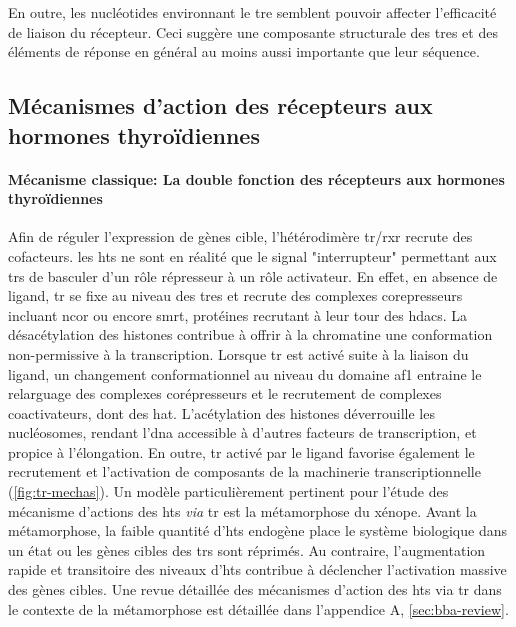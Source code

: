 

En outre, les nucléotides environnant le \gls{tre} semblent pouvoir affecter l'efficacité de liaison du récepteur.
Ceci suggère une composante structurale des \glspl{tre} et des éléments de réponse en général au moins aussi importante que leur séquence.



\subsection{Mécanismes d'action des récepteurs aux hormones thyroïdiennes}

\paragraph{Mécanisme classique: La double fonction des récepteurs aux hormones thyroïdiennes}
Afin de réguler l'expression de gènes cible, l'hétérodimère \gls{tr}/\gls{rxr} recrute des cofacteurs.
les \glspl{ht} ne sont en réalité que le signal "interrupteur" permettant aux \glspl{tr} de basculer d'un rôle répresseur à un rôle activateur.
En effet, en absence de ligand, \gls{tr} se fixe au niveau des \glspl{tre} et recrute des complexes corepresseurs incluant \gls{ncor} ou encore \gls{smrt}, protéines recrutant à leur tour des \glspl{hdac}.
La désacétylation des histones contribue à offrir à la chromatine une conformation non-permissive à la transcription.
Lorsque \gls{tr} est activé suite à la liaison du ligand, un changement conformationnel au niveau du domaine \gls{af1} entraine le relarguage des complexes corépresseurs et le recrutement de complexes coactivateurs, dont des \gls{hat}.
L'acétylation des histones déverrouille les nucléosomes, rendant l'\gls{dna} accessible à d'autres facteurs de transcription, et propice à l'élongation.
En outre, \gls{tr} activé par le ligand favorise également le recrutement et l'activation de composants de la machinerie transcriptionnelle (\autoref{fig:tr-mechas}).
Un modèle particulièrement pertinent pour l'étude des mécanisme d'actions des \glspl{ht} \textit{via} \gls{tr} est la métamorphose du xénope.
Avant la métamorphose, la faible quantité d'\glspl{ht} endogène place le système biologique dans un état ou les gènes cibles des \glspl{tr} sont réprimés.
Au contraire, l'augmentation rapide et transitoire des niveaux d'\glspl{ht} contribue à déclencher l'activation massive des gènes cibles.
Une revue détaillée des mécanismes d'action des \glspl{ht} via \gls{tr} dans le contexte de la métamorphose est détaillée dans l'appendice A, \autoref{sec:bba-review}.

